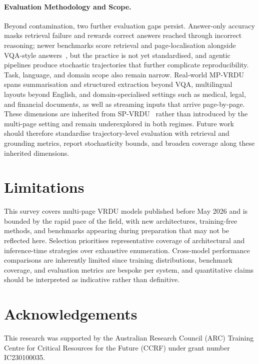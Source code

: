 \documentclass[11pt]{article}
\begin{document}
\paragraph{Evaluation Methodology and Scope.}
\label{sec:evaluation}
Beyond contamination, two further evaluation gaps persist. Answer-only accuracy masks retrieval failure and rewards correct answers reached through incorrect reasoning; newer benchmarks score retrieval and page-localisation alongside VQA-style answers~\cite{hui2024uda, xiong2026docr1, zhu2025doclens}, but the practice is not yet standardised, and agentic pipelines produce stochastic trajectories that further complicate reproducibility. Task, language, and domain scope also remain narrow. Real-world MP-VRDU spans summarisation and structured extraction beyond VQA, multilingual layouts beyond English, and domain-specialised settings such as medical, legal, and financial documents, as well as streaming inputs that arrive page-by-page. These dimensions are inherited from SP-VRDU~\cite{ding2025survey} rather than introduced by the multi-page setting and remain underexplored in both regimes. Future work should therefore standardise trajectory-level evaluation with retrieval and grounding metrics, report stochasticity bounds, and broaden coverage along these inherited dimensions.

\newpage

\section*{Limitations}
This survey covers multi-page VRDU models published before May 2026 and is bounded by the rapid pace of the field, with new architectures, training-free methods, and benchmarks appearing during preparation that may not be reflected here. Selection prioritises representative coverage of architectural and inference-time strategies over exhaustive enumeration. Cross-model performance comparisons are inherently limited since training distributions, benchmark coverage, and evaluation metrics are bespoke per system, and quantitative claims should be interpreted as indicative rather than definitive.

\section*{Acknowledgements}
This research was supported by the Australian Research Council (ARC) Training Centre for Critical Resources for the Future (CCRF) under grant number IC230100035.
%

\end{document}
